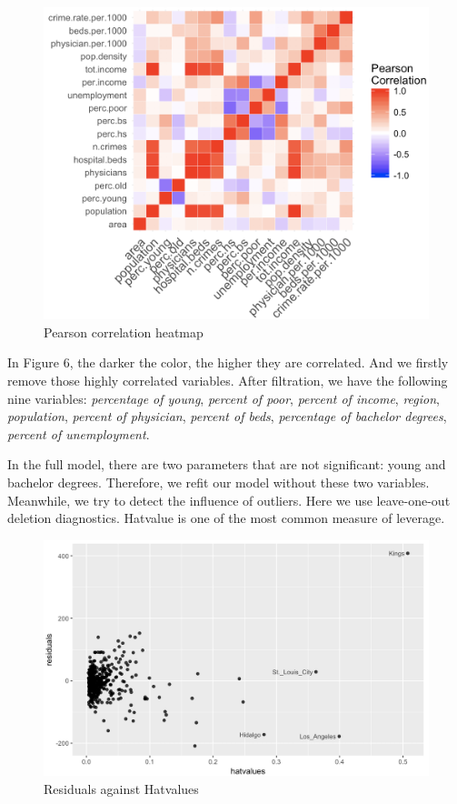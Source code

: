 \documentclass[oneside,11pt]{homework}
\begin{document}
\begin{figure}[H]
\centering
\includegraphics[scale=0.55]{heatmap.png}
\caption{Pearson correlation heatmap} 
\end{figure}

In Figure 6, the darker the color, the higher they are correlated. And we firstly remove those highly correlated variables. After filtration, we have the following nine variables: \textit{percentage of young}, \textit{percent of poor}, \textit{percent of income}, \textit{region}, \textit{population}, \textit{percent of physician}, \textit{percent of beds}, \textit{percentage of bachelor degrees}, \textit{percent of unemployment}.\par

In the full model, there are two parameters that are not significant: young and bachelor degrees. Therefore, we refit our model without these two variables. Meanwhile, we try to detect the influence of outliers. Here we use leave-one-out deletion diagnostics. Hatvalue is one of the most common measure of leverage.

\begin{figure}[H]
\centering
\includegraphics[scale=0.45]{hatvalue.png}
\caption{Residuals against Hatvalues} 
\end{figure}
\end{document}
